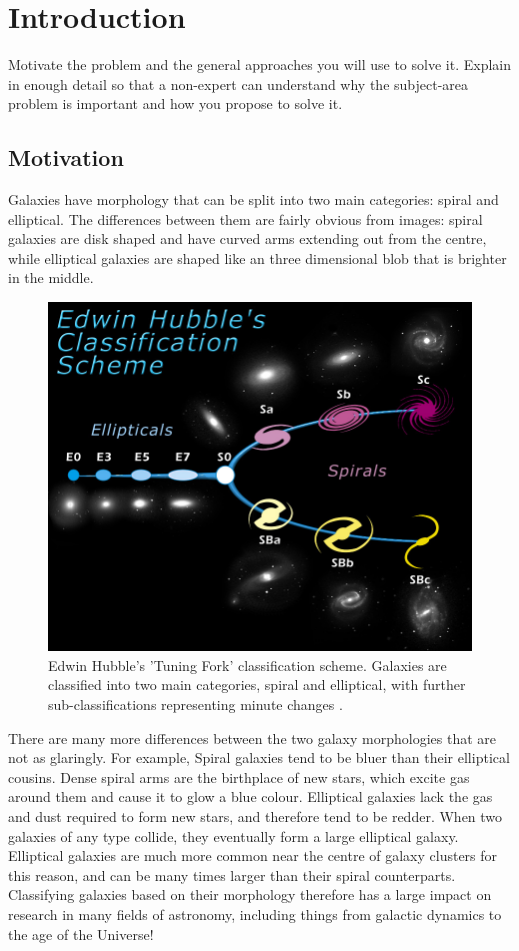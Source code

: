 \section{Introduction}
\label{sec:intro}
Motivate the problem and the general approaches you will use to solve it. Explain in enough detail so that a non-expert can understand why the subject-area problem is important and how you propose to solve it.

\subsection{Motivation}
Galaxies have morphology that can be split into two main categories: spiral and elliptical. 
The differences between them are fairly obvious from images: spiral galaxies are disk shaped and have curved arms extending out from the centre, while elliptical galaxies are shaped like an three dimensional blob that is brighter in the middle. 

\begin{figure}[h]
	\centering
	\includegraphics[scale=0.7]{Figures/TuningFork.jpg}
	\caption{Edwin Hubble's 'Tuning Fork' classification scheme. Galaxies are classified into two main categories, spiral and elliptical, with further sub-classifications representing minute changes \cite{TuningFork}.}
	\label{fig:tuningfork}
\end{figure}


There are many more differences between the two galaxy morphologies that are not as glaringly.  
For example, Spiral galaxies tend to be bluer than their elliptical cousins. 
Dense spiral arms are the birthplace of new stars, which excite gas around them and cause it to glow a blue colour. 
Elliptical galaxies lack the gas and dust required to form new stars, and therefore tend to be redder. 
When two galaxies of any type collide, they eventually form a large elliptical galaxy. 
Elliptical galaxies are much more common near the centre of galaxy clusters for this reason, and can be many times larger than their spiral counterparts.
Classifying galaxies based on their morphology therefore has a large impact on research in many fields of astronomy, including things from galactic dynamics to the age of the Universe!


